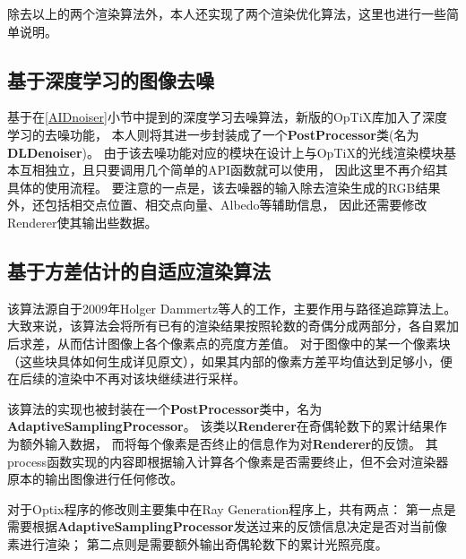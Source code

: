 除去以上的两个渲染算法外，本人还实现了两个渲染优化算法，这里也进行一些简单说明。

\subsection{基于深度学习的图像去噪}

基于在\ref{AIDnoiser}小节中提到的深度学习去噪算法\cite{chaitanya2017interactive}，新版的OpTiX库加入了深度学习的去噪功能，
本人则将其进一步封装成了一个\textbf{PostProcessor}类(名为\textbf{DLDenoiser})。
由于该去噪功能对应的模块在设计上与OpTiX的光线渲染模块基本互相独立，且只要调用几个简单的API函数就可以使用，
因此这里不再介绍其具体的使用流程。
要注意的一点是，该去噪器的输入除去渲染生成的RGB结果外，还包括相交点位置、相交点向量、Albedo等辅助信息，
因此还需要修改Renderer使其输出些数据。

\subsection{基于方差估计的自适应渲染算法}

\label{adaptive}

该算法源自于2009年Holger Dammertz等人的工作\cite{dammertz2010hierarchical}，主要作用与路径追踪算法上。
大致来说，该算法会将所有已有的渲染结果按照轮数的奇偶分成两部分，各自累加后求差，从而估计图像上各个像素点的亮度方差值。
对于图像中的某一个像素块（这些块具体如何生成详见原文），如果其内部的像素方差平均值达到足够小，便在后续的渲染中不再对该块继续进行采样。

该算法的实现也被封装在一个\textbf{PostProcessor}类中，名为\textbf{AdaptiveSamplingProcessor}。
该类以\textbf{Renderer}在奇偶轮数下的累计结果作为额外输入数据，
而将每个像素是否终止的信息作为对\textbf{Renderer}的反馈。
其process函数实现的内容即根据输入计算各个像素是否需要终止，但不会对渲染器原本的输出图像进行任何修改。

对于Optix程序的修改则主要集中在Ray Generation程序上，共有两点：
第一点是需要根据\textbf{AdaptiveSamplingProcessor}发送过来的反馈信息决定是否对当前像素进行渲染；
第二点则是需要额外输出奇偶轮数下的累计光照亮度。

